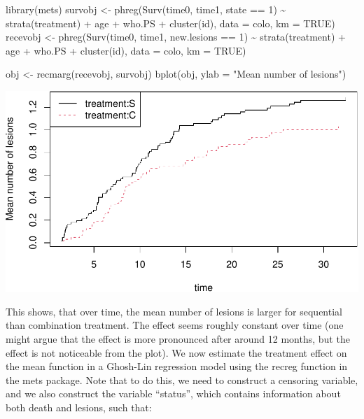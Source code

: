 \documentclass[
  11pt,
]{article}
\newenvironment{Shaded}{\begin{snugshade}}{\end{snugshade}}
\newcommand{\AttributeTok}[1]{\textcolor[rgb]{0.77,0.63,0.00}{#1}}
\newcommand{\ConstantTok}[1]{\textcolor[rgb]{0.00,0.00,0.00}{#1}}
\newcommand{\DecValTok}[1]{\textcolor[rgb]{0.00,0.00,0.81}{#1}}
\newcommand{\FunctionTok}[1]{\textcolor[rgb]{0.00,0.00,0.00}{#1}}
\newcommand{\NormalTok}[1]{#1}
\newcommand{\OtherTok}[1]{\textcolor[rgb]{0.56,0.35,0.01}{#1}}
\newcommand{\SpecialCharTok}[1]{\textcolor[rgb]{0.00,0.00,0.00}{#1}}
\newcommand{\StringTok}[1]{\textcolor[rgb]{0.31,0.60,0.02}{#1}}
\begin{document}
\begin{Shaded}
\begin{Highlighting}[]
\FunctionTok{library}\NormalTok{(mets)}
\NormalTok{survobj }\OtherTok{\textless{}{-}} \FunctionTok{phreg}\NormalTok{(}\FunctionTok{Surv}\NormalTok{(time0, time1, state }\SpecialCharTok{==} \DecValTok{1}\NormalTok{) }\SpecialCharTok{\textasciitilde{}} \FunctionTok{strata}\NormalTok{(treatment) }\SpecialCharTok{+}\NormalTok{ age }\SpecialCharTok{+} 
\NormalTok{                   who.PS }\SpecialCharTok{+} \FunctionTok{cluster}\NormalTok{(id), }\AttributeTok{data =}\NormalTok{ colo, }\AttributeTok{km =} \ConstantTok{TRUE}\NormalTok{)}
\NormalTok{recevobj }\OtherTok{\textless{}{-}} \FunctionTok{phreg}\NormalTok{(}\FunctionTok{Surv}\NormalTok{(time0, time1, new.lesions }\SpecialCharTok{==} \DecValTok{1}\NormalTok{) }\SpecialCharTok{\textasciitilde{}} \FunctionTok{strata}\NormalTok{(treatment) }\SpecialCharTok{+} 
\NormalTok{                  age }\SpecialCharTok{+}\NormalTok{ who.PS }\SpecialCharTok{+} \FunctionTok{cluster}\NormalTok{(id), }\AttributeTok{data =}\NormalTok{ colo, }\AttributeTok{km =} \ConstantTok{TRUE}\NormalTok{)}

\NormalTok{obj }\OtherTok{\textless{}{-}} \FunctionTok{recmarg}\NormalTok{(recevobj, survobj)}
\FunctionTok{bplot}\NormalTok{(obj, }\AttributeTok{ylab =} \StringTok{"Mean number of lesions"}\NormalTok{)}
\end{Highlighting}
\end{Shaded}

\includegraphics{Exam2021_PracticalPart_files/figure-latex/unnamed-chunk-14-1.pdf}

This shows, that over time, the mean number of lesions is larger for
sequential than combination treatment. The effect seems roughly constant
over time (one might argue that the effect is more pronounced after
around 12 months, but the effect is not noticeable from the plot). We
now estimate the treatment effect on the mean function in a Ghosh-Lin
regression model using the recreg function in the mets package. Note
that to do this, we need to construct a censoring variable, and we also
construct the variable ``status'', which contains information about both
death and lesions, such that:
\end{document}
